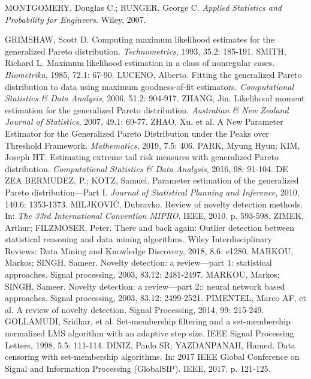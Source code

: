 \documentclass[11pt,twoside,openright]{report}
\begin{document}
\begin{thebibliography}{L}
MONTGOMERY, Douglas C.; RUNGER, George C. \textit{Applied Statistics and Probability for Engineers}. Wiley, 2007.

GRIMSHAW, Scott D. Computing maximum likelihood estimates for the generalized Pareto distribution. \textit{Technometrics}, 1993, 35.2: 185-191.
SMITH, Richard L. Maximum likelihood estimation in a class of nonregular cases. \textit{Biometrika}, 1985, 72.1: 67-90.
LUCENO, Alberto. Fitting the generalized Pareto distribution to data using maximum goodness-of-fit estimators. \textit{Computational Statistics \& Data Analysis}, 2006, 51.2: 904-917.
ZHANG, Jin. Likelihood moment estimation for the generalized Pareto distribution. \textit{Australian \& New Zealand Journal of Statistics}, 2007, 49.1: 69-77.
ZHAO, Xu, et al. A New Parameter Estimator for the Generalized Pareto Distribution under the Peaks over Threshold Framework. \textit{Mathematics}, 2019, 7.5: 406.
PARK, Myung Hyun; KIM, Joseph HT. Estimating extreme tail risk measures with generalized Pareto distribution. \textit{Computational Statistics \& Data Analysis}, 2016, 98: 91-104.
DE ZEA BERMUDEZ, P.; KOTZ, Samuel. Parameter estimation of the generalized Pareto distribution—Part I. \textit{Journal of Statistical Planning and Inference}, 2010, 140.6: 1353-1373.
MILJKOVIĆ, Dubravko. Review of novelty detection methods. In: \textit{The 33rd International Convention MIPRO}. IEEE, 2010. p. 593-598.
ZIMEK, Arthur; FILZMOSER, Peter. There and back again: Outlier detection between statistical reasoning and data mining algorithms. Wiley Interdisciplinary Reviews: Data Mining and Knowledge Discovery, 2018, 8.6: e1280.
MARKOU, Markos; SINGH, Sameer. Novelty detection: a review—part 1: statistical approaches. Signal processing, 2003, 83.12: 2481-2497.
MARKOU, Markos; SINGH, Sameer. Novelty detection: a review—part 2:: neural network based approaches. Signal processing, 2003, 83.12: 2499-2521.
PIMENTEL, Marco AF, et al. A review of novelty detection. Signal Processing, 2014, 99: 215-249.
GOLLAMUDI, Sridhar, et al. Set-membership filtering and a set-membership normalized LMS algorithm with an adaptive step size. IEEE Signal Processing Letters, 1998, 5.5: 111-114.
DINIZ, Paulo SR; YAZDANPANAH, Hamed. Data censoring with set-membership algorithms. In: 2017 IEEE Global Conference on Signal and Information Processing (GlobalSIP). IEEE, 2017. p. 121-125.

\end{thebibliography}
\end{document}
